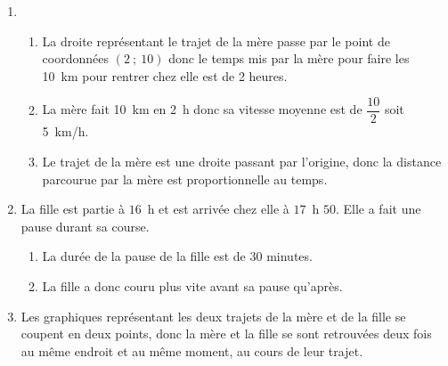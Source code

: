 \begin{enumerate}
\item 
	\begin{enumerate}
		\item %
La droite représentant le trajet de la mère passe par le point de coordonnées $(2~;~10)$ donc  le temps mis par la mère pour faire les 10~km pour rentrer chez elle est de 2 heures.
		
		\item %
La mère fait 10~km en 2~h donc sa vitesse moyenne est de $\dfrac{10}{2}$ soit 5~km/h.

		\item%
Le trajet de la mère est une droite passant par l'origine, donc la distance  parcourue par la mère est proportionnelle au temps.
		
	\end{enumerate}
\item La fille est partie à $16$~h et est arrivée chez elle à $17$~h $50$. Elle a fait une pause durant sa course. 
	\begin{enumerate}
		\item La durée de la pause de la fille est de 30 minutes.
		 
		\item %


La fille a donc couru plus vite avant sa pause qu'après.
		\end{enumerate}
		
\item %
Les graphiques représentant les deux trajets de la mère et de la fille se coupent en deux points, donc  la mère et la fille se sont retrouvées deux fois au même endroit et au même moment, au cours de leur trajet.


\end{enumerate}
